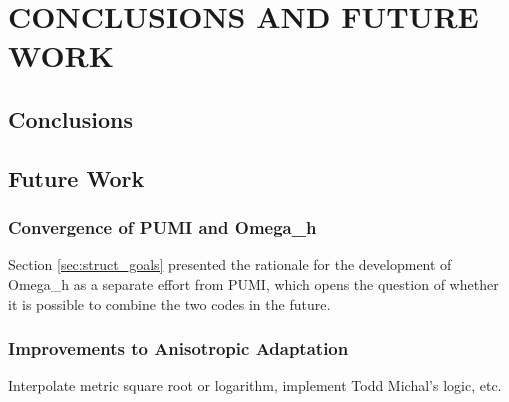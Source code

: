 
\chapter{CONCLUSIONS AND FUTURE WORK}

\section{Conclusions}

\section{Future Work}

\subsection{Convergence of PUMI and Omega\_h}

Section \ref{sec:struct_goals} presented the rationale
for the development of Omega\_h as a separate effort from PUMI,
which opens the question of whether it is possible
to combine the two codes in the future.


\subsection{Improvements to Anisotropic Adaptation}

Interpolate metric square root or logarithm,
implement Todd Michal's logic, etc.
